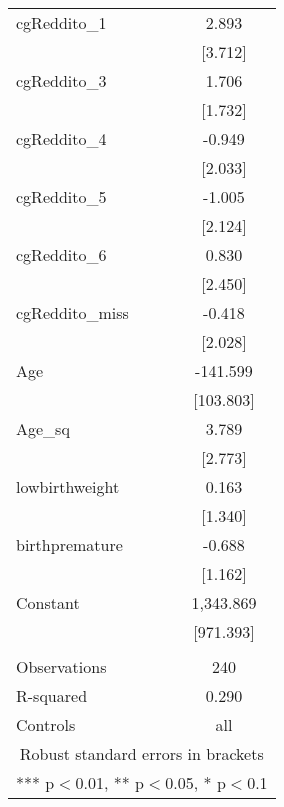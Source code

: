 \documentclass[]{article}
\begin{document}
\begin{tabular}{lc}
cgReddito\_1 & 2.893 \\
 & [3.712] \\
cgReddito\_3 & 1.706 \\
 & [1.732] \\
cgReddito\_4 & -0.949 \\
 & [2.033] \\
cgReddito\_5 & -1.005 \\
 & [2.124] \\
cgReddito\_6 & 0.830 \\
 & [2.450] \\
cgReddito\_miss & -0.418 \\
 & [2.028] \\
Age & -141.599 \\
 & [103.803] \\
Age\_sq & 3.789 \\
 & [2.773] \\
lowbirthweight & 0.163 \\
 & [1.340] \\
birthpremature & -0.688 \\
 & [1.162] \\
Constant & 1,343.869 \\
 & [971.393] \\
 &  \\
Observations & 240 \\
R-squared & 0.290 \\
 Controls & all \\ \hline
\multicolumn{2}{c}{ Robust standard errors in brackets} \\
\multicolumn{2}{c}{ *** p$<$0.01, ** p$<$0.05, * p$<$0.1} \\
\end{tabular}
\end{document}
